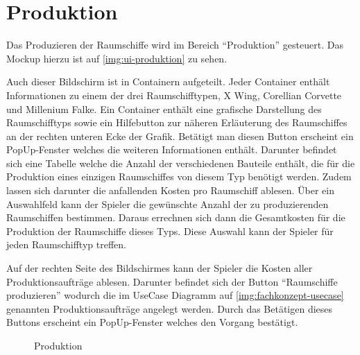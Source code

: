 \section{Produktion}
\label{sec:ui-produktion}


Das Produzieren der Raumschiffe wird im Bereich “Produktion” gesteuert. Das Mockup hierzu ist auf \vref{img:ui-produktion} zu sehen. 

Auch dieser Bildschirm ist in Containern aufgeteilt. Jeder Container enthält Informationen zu einem der drei Raumschifftypen, X Wing, Corellian Corvette und Millenium Falke. Ein Container enthält eine grafische Darstellung des Raumschifftyps sowie ein Hilfebutton zur näheren Erläuterung des Raumschiffes an der rechten unteren Ecke der Grafik. Betätigt man diesen Button erscheint ein PopUp-Fenster welches die weiteren Informationen enthält. Darunter befindet sich eine Tabelle welche die Anzahl der verschiedenen Bauteile enthält, die für die Produktion eines einzigen Raumschiffes von diesem Typ benötigt werden. Zudem lassen sich darunter die anfallenden Kosten pro Raumschiff ablesen. Über ein Auswahlfeld kann der Spieler die gewünschte Anzahl der zu produzierenden Raumschiffen bestimmen. Daraus errechnen sich dann die Gesamtkosten für die Produktion der Raumschiffe dieses Typs. Diese Auswahl kann der Spieler für jeden Raumschifftyp treffen.

Auf der rechten Seite des Bildschirmes kann der Spieler die Kosten aller Produktionsaufträge ablesen. Darunter befindet sich der Button “Raumschiffe produzieren” wodurch die im UseCase Diagramm auf \vref{img:fachkonzept-usecase} genannten Produktionsaufträge angelegt werden. Durch das Betätigen dieses Buttons erscheint ein PopUp-Fenster welches den Vorgang bestätigt. 

\begin{figure}[h]
  \centering
  \caption{Produktion}
  \label{img:ui-produktion}
\end{figure}

\autorende{}
